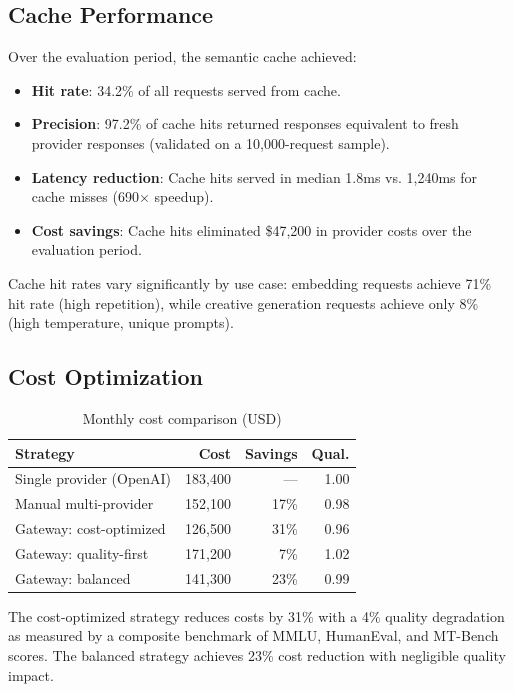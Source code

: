 \documentclass[11pt,twocolumn]{article}
\begin{document}
\subsection{Cache Performance}

Over the evaluation period, the semantic cache achieved:

\begin{itemize}[leftmargin=*]
    \item \textbf{Hit rate}: 34.2\% of all requests served from cache.
    \item \textbf{Precision}: 97.2\% of cache hits returned responses equivalent to fresh provider responses (validated on a 10,000-request sample).
    \item \textbf{Latency reduction}: Cache hits served in median 1.8ms vs. 1,240ms for cache misses (690$\times$ speedup).
    \item \textbf{Cost savings}: Cache hits eliminated \$47,200 in provider costs over the evaluation period.
\end{itemize}

Cache hit rates vary significantly by use case: embedding requests achieve 71\% hit rate (high repetition), while creative generation requests achieve only 8\% (high temperature, unique prompts).

\subsection{Cost Optimization}

\begin{table}[t]
\centering
\caption{Monthly cost comparison (USD)}
\label{tab:cost}
\begin{tabular}{@{}lrrr@{}}
\toprule
\textbf{Strategy} & \textbf{Cost} & \textbf{Savings} & \textbf{Qual.} \\
\midrule
Single provider (OpenAI) & 183,400 & --- & 1.00 \\
Manual multi-provider & 152,100 & 17\% & 0.98 \\
Gateway: cost-optimized & 126,500 & 31\% & 0.96 \\
Gateway: quality-first & 171,200 & 7\% & 1.02 \\
Gateway: balanced & 141,300 & 23\% & 0.99 \\
\bottomrule
\end{tabular}
\end{table}

The cost-optimized strategy reduces costs by 31\% with a 4\% quality degradation as measured by a composite benchmark of MMLU, HumanEval, and MT-Bench scores. The balanced strategy achieves 23\% cost reduction with negligible quality impact.
\end{document}

